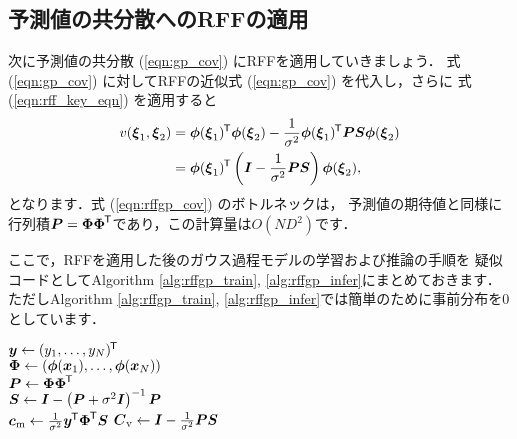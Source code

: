 \subsection{予測値の共分散へのRFFの適用}

次に予測値の共分散 (\ref{eqn:gp_cov}) にRFFを適用していきましょう．
式 (\ref{eqn:gp_cov}) に対してRFFの近似式 (\ref{eqn:gp_cov}) を代入し，さらに
式 (\ref{eqn:rff_key_eqn}) を適用すると
\begin{align}
    v(\boldsymbol{\xi}_1, \boldsymbol{\xi}_2)
    &= \boldsymbol{\phi}(\boldsymbol{\xi}_1)^{\mkern-1.5mu\mathsf{T}} \boldsymbol{\phi}(\boldsymbol{\xi}_2)
    - \frac{1}{\sigma^2} \boldsymbol{\phi}(\boldsymbol{\xi}_1)^{\mkern-1.5mu\mathsf{T}} \boldsymbol{PS} \boldsymbol{\phi}(\boldsymbol{\xi}_2)
    \notag \\
    &= \boldsymbol{\phi}(\boldsymbol{\xi}_1)^{\mkern-1.5mu\mathsf{T}}
    \left( \boldsymbol{I} - \frac{1}{\sigma^2} \boldsymbol{PS} \right)
    \boldsymbol{\phi}(\boldsymbol{\xi}_2),
    \label{eqn:rffgp_cov}
\end{align}
となります．式 (\ref{eqn:rffgp_cov}) のボトルネックは，
予測値の期待値と同様に行列積$\boldsymbol{P} = \boldsymbol{\Phi\Phi}^{\mkern-1.5mu\mathsf{T}}$であり，この計算量は$O(ND^2)$です．

ここで，RFFを適用した後のガウス過程モデルの学習および推論の手順を
疑似コードとしてAlgorithm \ref{alg:rffgp_train}, \ref{alg:rffgp_infer}にまとめておきます．
ただしAlgorithm \ref{alg:rffgp_train}, \ref{alg:rffgp_infer}では簡単のために事前分布を0としています．

\begin{algorithm}[t]
    \caption{}
    \label{alg:rffgp_train}
    $\boldsymbol{y} \gets (y_1, \ldots, y_N)^{\mkern-1.5mu\mathsf{T}}$ \\
    $\boldsymbol{\Phi} \gets (\boldsymbol{\phi}(\boldsymbol{x}_1), \ldots, \boldsymbol{\phi}(\boldsymbol{x}_N))$ \\
    $\boldsymbol{P} \gets \boldsymbol{\Phi\Phi}^{\mkern-1.5mu\mathsf{T}}$ \\
    $\boldsymbol{S} \gets \boldsymbol{I} - \left( \boldsymbol{P} + \sigma^2 \boldsymbol{I} \right)^{-1} \boldsymbol{P}$ \\
    $\boldsymbol{c}_\mathrm{m} \gets \frac{1}{\sigma^2} \boldsymbol{y}^{\mkern-1.5mu\mathsf{T}} \boldsymbol{\Phi}^{\mkern-1.5mu\mathsf{T}} \boldsymbol{S}$
    \hfill{}
    $\boldsymbol{C}_\mathrm{v} \gets \boldsymbol{I} - \frac{1}{\sigma^2} \boldsymbol{PS}$
    \hfill{}
\end{algorithm}

